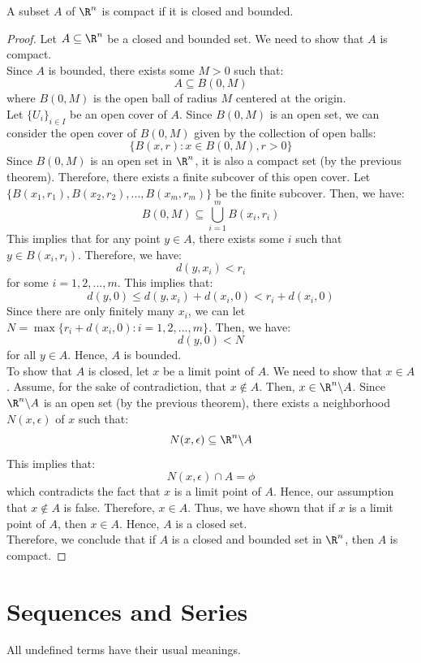 \documentclass[openany]{book}
\begin{document}
\begin{mytheorem}
    A subset $A$ of $\R^n$ is compact if it is closed and bounded.
\end{mytheorem}
\begin{proof}
    Let $A \subseteq \R^n$ be a closed and bounded set. We need to show that $A$ is compact. \\
    Since $A$ is bounded, there exists some $M > 0$ such that:
    $$A \subseteq B(0, M)$$
    where $B(0, M)$ is the open ball of radius $M$ centered at the origin. \\
    Let $\{U_i\}_{i \in I}$ be an open cover of $A$. Since $B(0, M)$ is an open set, we can consider the open cover of $B(0, M)$ given by the collection of open balls:
    $$\{B(x, r) : x \in B(0, M), r > 0\}$$
    Since $B(0, M)$ is an open set in $\R^n$, it is also a compact set (by the previous theorem). Therefore, there exists a finite subcover of this open cover. Let $\{B(x_1, r_1), B(x_2, r_2), ..., B(x_m, r_m)\}$ be the finite subcover. Then, we have:
    $$B(0, M) \subseteq \bigcup_{i=1}^{m} B(x_i, r_i)$$
    This implies that for any point $y \in A$, there exists some $i$ such that $y \in B(x_i, r_i)$. Therefore, we have:
    $$d(y, x_i) < r_i$$
    for some $i = 1, 2, ..., m$. This implies that:
    $$d(y, 0) \leq d(y, x_i) + d(x_i, 0) < r_i + d(x_i, 0)$$
    Since there are only finitely many $x_i$, we can let $N = \max\{r_i + d(x_i, 0) : i = 1, 2, ..., m\}$. Then, we have:
    $$d(y, 0) < N$$
    for all $y \in A$. Hence, $A$ is bounded. \\
    To show that $A$ is closed, let $x$ be a limit point of $A$. We need to show that $x \in A$. Assume, for the sake of contradiction, that $x \notin A$. Then, $x \in \R^n \backslash A$. Since $\R^n \backslash A$ is an open set (by the previous theorem), there exists a neighborhood $N(x, \epsilon)$ of $x$ such that:
    $$N(x, \epsilon) \subseteq \R^n \backslash A$$
    This implies that:
    $$N(x, \epsilon) \cap A = \phi$$
    which contradicts the fact that $x$ is a limit point of $A$. Hence, our assumption that $x \notin A$ is false. Therefore, $x \in A$. Thus, we have shown that if $x$ is a limit point of $A$, then $x \in A$. Hence, $A$ is a closed set. \\
    Therefore, we conclude that if $A$ is a closed and bounded set in $\R^n$, then $A$ is compact.
\end{proof}
\chapter{Sequences and Series}
All undefined terms have their usual meanings. 
\end{document}
